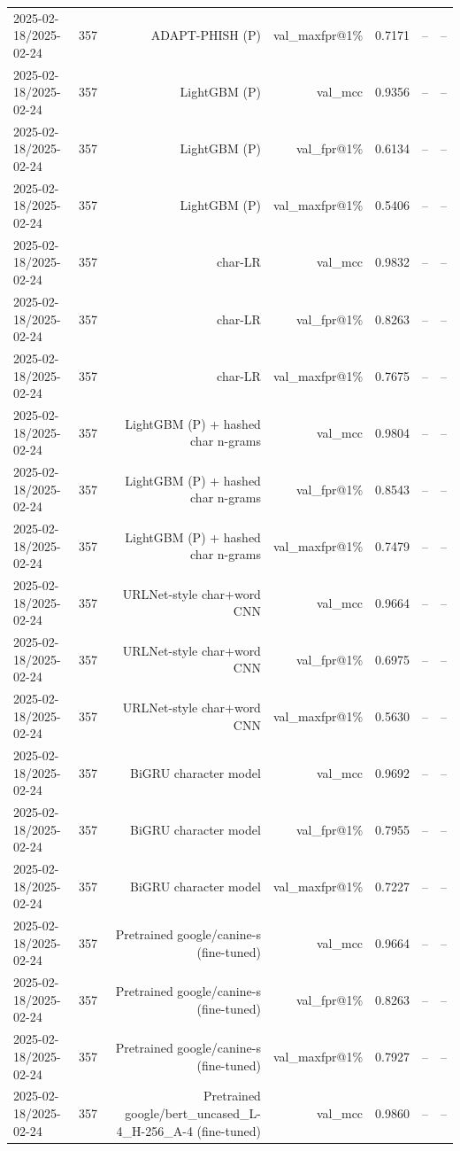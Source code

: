 \begin{table}[t]
\begin{tabular}{llrrrrr}
2025-02-18/2025-02-24 & 357 & ADAPT-PHISH (P) & val\_maxfpr@1\% & 0.7171 & -- & -- \\
2025-02-18/2025-02-24 & 357 & LightGBM (P) & val\_mcc & 0.9356 & -- & -- \\
2025-02-18/2025-02-24 & 357 & LightGBM (P) & val\_fpr@1\% & 0.6134 & -- & -- \\
2025-02-18/2025-02-24 & 357 & LightGBM (P) & val\_maxfpr@1\% & 0.5406 & -- & -- \\
2025-02-18/2025-02-24 & 357 & char-LR & val\_mcc & 0.9832 & -- & -- \\
2025-02-18/2025-02-24 & 357 & char-LR & val\_fpr@1\% & 0.8263 & -- & -- \\
2025-02-18/2025-02-24 & 357 & char-LR & val\_maxfpr@1\% & 0.7675 & -- & -- \\
2025-02-18/2025-02-24 & 357 & LightGBM (P) + hashed char n-grams & val\_mcc & 0.9804 & -- & -- \\
2025-02-18/2025-02-24 & 357 & LightGBM (P) + hashed char n-grams & val\_fpr@1\% & 0.8543 & -- & -- \\
2025-02-18/2025-02-24 & 357 & LightGBM (P) + hashed char n-grams & val\_maxfpr@1\% & 0.7479 & -- & -- \\
2025-02-18/2025-02-24 & 357 & URLNet-style char+word CNN & val\_mcc & 0.9664 & -- & -- \\
2025-02-18/2025-02-24 & 357 & URLNet-style char+word CNN & val\_fpr@1\% & 0.6975 & -- & -- \\
2025-02-18/2025-02-24 & 357 & URLNet-style char+word CNN & val\_maxfpr@1\% & 0.5630 & -- & -- \\
2025-02-18/2025-02-24 & 357 & BiGRU character model & val\_mcc & 0.9692 & -- & -- \\
2025-02-18/2025-02-24 & 357 & BiGRU character model & val\_fpr@1\% & 0.7955 & -- & -- \\
2025-02-18/2025-02-24 & 357 & BiGRU character model & val\_maxfpr@1\% & 0.7227 & -- & -- \\
2025-02-18/2025-02-24 & 357 & Pretrained google/canine-s (fine-tuned) & val\_mcc & 0.9664 & -- & -- \\
2025-02-18/2025-02-24 & 357 & Pretrained google/canine-s (fine-tuned) & val\_fpr@1\% & 0.8263 & -- & -- \\
2025-02-18/2025-02-24 & 357 & Pretrained google/canine-s (fine-tuned) & val\_maxfpr@1\% & 0.7927 & -- & -- \\
2025-02-18/2025-02-24 & 357 & Pretrained google/bert\_uncased\_L-4\_H-256\_A-4 (fine-tuned) & val\_mcc & 0.9860 & -- & -- \\

\end{tabular}
\end{table}
